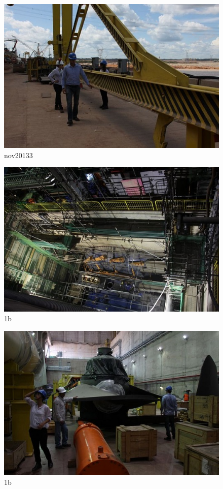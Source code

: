 \begin{figure}[h!]
  \centering
  \includegraphics[width=1\linewidth]{Fotos/Novembro2013/3.jpg}
  \caption{nov20133}
  \label{nov20133}
\end{figure}

\begin{figure}[h!]
  \centering
  \includegraphics[width=1\linewidth]{Fotos/Novembro2013/4.jpg}
  \caption{1b}
  \label{nov20134}
\end{figure}

\begin{figure}[h!]
  \centering
  \includegraphics[width=1\linewidth]{Fotos/Novembro2013/5.jpg}
  \caption{1b}
  \label{nov20135}
\end{figure}

